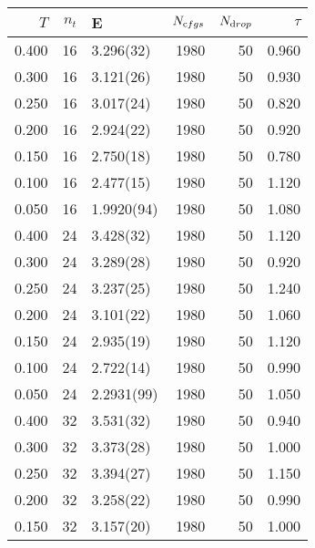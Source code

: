 \begin{tabular}{rrlrrr}
\hline
   $T$ &   $n_t$ & E          &   $N_{\textrm cfgs}$ &   $N_{\textrm drop}$ &   $\tau$ \\
\hline
 0.400 &      16 & 3.296(32)  &                 1980 &                   50 &    0.960 \\
 0.300 &      16 & 3.121(26)  &                 1980 &                   50 &    0.930 \\
 0.250 &      16 & 3.017(24)  &                 1980 &                   50 &    0.820 \\
 0.200 &      16 & 2.924(22)  &                 1980 &                   50 &    0.920 \\
 0.150 &      16 & 2.750(18)  &                 1980 &                   50 &    0.780 \\
 0.100 &      16 & 2.477(15)  &                 1980 &                   50 &    1.120 \\
 0.050 &      16 & 1.9920(94) &                 1980 &                   50 &    1.080 \\
 0.400 &      24 & 3.428(32)  &                 1980 &                   50 &    1.120 \\
 0.300 &      24 & 3.289(28)  &                 1980 &                   50 &    0.920 \\
 0.250 &      24 & 3.237(25)  &                 1980 &                   50 &    1.240 \\
 0.200 &      24 & 3.101(22)  &                 1980 &                   50 &    1.060 \\
 0.150 &      24 & 2.935(19)  &                 1980 &                   50 &    1.120 \\
 0.100 &      24 & 2.722(14)  &                 1980 &                   50 &    0.990 \\
 0.050 &      24 & 2.2931(99) &                 1980 &                   50 &    1.050 \\
 0.400 &      32 & 3.531(32)  &                 1980 &                   50 &    0.940 \\
 0.300 &      32 & 3.373(28)  &                 1980 &                   50 &    1.000 \\
 0.250 &      32 & 3.394(27)  &                 1980 &                   50 &    1.150 \\
 0.200 &      32 & 3.258(22)  &                 1980 &                   50 &    0.990 \\
 0.150 &      32 & 3.157(20)  &                 1980 &                   50 &    1.000 \\

\end{tabular}
